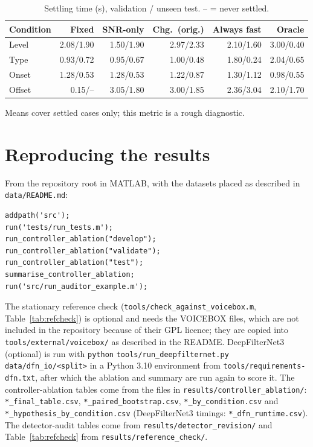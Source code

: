 \documentclass[10pt,conference,a4paper]{IEEEtran}
\begin{document}
\begin{table}[h]
\centering
\caption{Settling time (s), validation / unseen test. -- = never settled.}
\label{tab:settle}
\scriptsize
\setlength{\tabcolsep}{2pt}
\begin{tabular}{@{}lrrrrr@{}}
\toprule
Condition & Fixed & SNR-only & Chg.\ (orig.) & Always fast & Oracle\\
\midrule
Level & 2.08/1.90 & 1.50/1.90 & 2.97/2.33 & 2.10/1.60 & 3.00/0.40\\
Type & 0.93/0.72 & 0.95/0.67 & 1.00/0.48 & 1.80/0.24 & 2.04/0.65\\
Onset & 1.28/0.53 & 1.28/0.53 & 1.22/0.87 & 1.30/1.12 & 0.98/0.55\\
Offset & 0.15/-- & 3.05/1.80 & 3.00/1.85 & 2.36/3.04 & 2.10/1.70\\
\bottomrule
\end{tabular}
\end{table}

Means cover settled cases only; this metric is a rough diagnostic.

\section{Reproducing the results}
\label{app:repro}
From the repository root in MATLAB, with the datasets placed as described in
\texttt{data/README.md}:

{\footnotesize
\begin{verbatim}
addpath('src');
run('tests/run_tests.m');
run_controller_ablation("develop");
run_controller_ablation("validate");
run_controller_ablation("test");
summarise_controller_ablation;
run('src/run_auditor_example.m');
\end{verbatim}
}

{\raggedright\noindent The stationary reference check
(\texttt{tools/check\_against\_voicebox.m}, Table~\ref{tab:refcheck}) is
optional and needs the VOICEBOX files, which are not included in the repository
because of their GPL licence; they are copied into
\texttt{tools/external/voicebox/} as described in the README. DeepFilterNet3 (optional) is run with
\texttt{python} \texttt{tools/run\_deepfilternet.py} \texttt{data/dfn\_io/<split>} in a Python 3.10
environment from \texttt{tools/requirements-dfn.txt}, after which the ablation
and summary are run again to score it. The controller-ablation tables come from the files in
\texttt{results/controller\_ablation/}: \texttt{*\_final\_table.csv},
\texttt{*\_paired\_bootstrap.csv}, \texttt{*\_by\_condition.csv} and
\texttt{*\_hypothesis\_by\_condition.csv} (DeepFilterNet3 timings:
\texttt{*\_dfn\_runtime.csv}). The detector-audit tables come from
\texttt{results/detector\_revision/} and Table~\ref{tab:refcheck} from
\texttt{results/reference\_check/}.\par}
\end{document}
